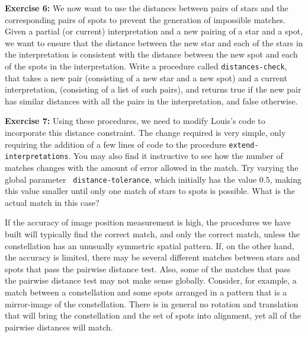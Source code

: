 {\bf Exercise 6:} We now want to use the distances between pairs of
stars and the corresponding pairs of spots to prevent the generation
of impossible matches.  Given a partial (or current) interpretation
and a new pairing of a star and a spot, we want to ensure that the
distance between the new star and each of the stars in the
interpretation is consistent with the distance between the new spot
and each of the spots in the interpretation.  Write a procedure called
{\tt distances-check}, that takes a new pair (consisting of a new star
and a new spot) and a current interpretation, (consisting of a list of
such pairs), and returns true if the new pair has similar distances
with all the pairs in the interpretation, and false otherwise.


\null

{\bf Exercise 7:} Using these procedures, we need to modify Louis's
code to incorporate this distance constraint.  The change required is
very simple, only requiring the addition of a few lines of code to the
procedure {\tt extend-interpretations}.  You may also find it
instructive to see how the number of matches changes with the amount
of error allowed in the match.  Try varying the global parameter {\tt
distance-tolerance}, which initially has the value $0.5$, making this
value smaller until only one match of stars to spots is possible.
What is the actual match in this case?

\null

If the accuracy of image position measurement is high, the procedures we have
built will typically find the correct match, and only the correct match, unless
the constellation has an unusually symmetric spatial pattern.  If, on the other
hand, the accuracy is limited, there may be several different matches between
stars and spots that pass the pairwise distance test.  Also, some of the
matches that pass the pairwise distance test may not make sense globally.
Consider, for example, a match between a constellation and some spots arranged
in a pattern that is a mirror-image of the constellation.  There is in general
no rotation and translation that will bring the constellation and the set of
spots into alignment, yet all of the pairwise distances will match.  

